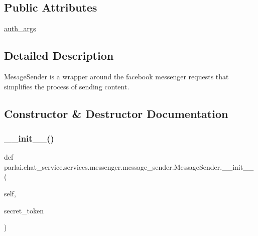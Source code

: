 \subsection*{Public Attributes}
\begin{DoxyCompactItemize}
\item 
\hyperlink{classparlai_1_1chat__service_1_1services_1_1messenger_1_1message__sender_1_1MessageSender_a748eb4858eed560aba381963050ad4b1}{auth\+\_\+args}
\end{DoxyCompactItemize}


\subsection{Detailed Description}
\begin{DoxyVerb}MesageSender is a wrapper around the facebook messenger requests that simplifies the
process of sending content.
\end{DoxyVerb}
 

\subsection{Constructor \& Destructor Documentation}
\mbox{\label{classparlai_1_1chat__service_1_1services_1_1messenger_1_1message__sender_1_1MessageSender_aaedf425b46271ec9c4b36f4b01914496}} 
\subsubsection{\texorpdfstring{\+\_\+\+\_\+init\+\_\+\+\_\+()}{\_\_init\_\_()}}
{\footnotesize\ttfamily def parlai.\+chat\+\_\+service.\+services.\+messenger.\+message\+\_\+sender.\+Message\+Sender.\+\_\+\+\_\+init\+\_\+\+\_\+ (\begin{DoxyParamCaption}\item[{}]{self,  }\item[{}]{secret\+\_\+token }\end{DoxyParamCaption})}

